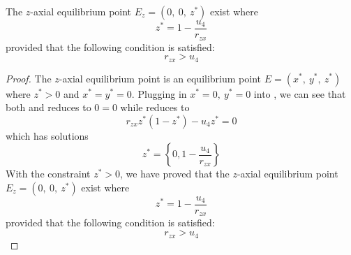 \begin{theorem}\label{thm:eq-axial-z-exist}
    The $z$-axial equilibrium point $E_z=\left(0,\ 0,\ z^*\right)$ exist where
    \begin{equation*}
        z^* = 1-\frac{u_4}{r_{zx}}
    \end{equation*}
    provided that the following condition is satisfied:
    \begin{equation*}
        r_{zx} > u_4
    \end{equation*}
\end{theorem}
\begin{proof}
    The $z$-axial equilibrium point is an equilibrium point $E=\left(x^*,\ y^*,\ z^*\right)$ where $z^*>0$ and $x^*=y^*=0$. Plugging in $x^*=0,\ y^*=0$ into , we can see that both  and  reduces to $0=0$ while  reduces to
    \begin{equation*}
        r_{zx}z^*\left(1-z^*\right)-u_4z^*=0
    \end{equation*}
    which has solutions
    \begin{equation*}
        z^*=\left\{0,1-\frac{u_4}{r_{zx}}\right\}
    \end{equation*}
    With the constraint $z^*>0$, we have proved that the $z$-axial equilibrium point $E_z=\left(0,\ 0,\ z^*\right)$ exist where
    \begin{equation*}
        z^* = 1-\frac{u_4}{r_{zx}}
    \end{equation*}
    provided that the following condition is satisfied:
    \begin{equation*}
        r_{zx} > u_4
    \end{equation*}
\end{proof}

